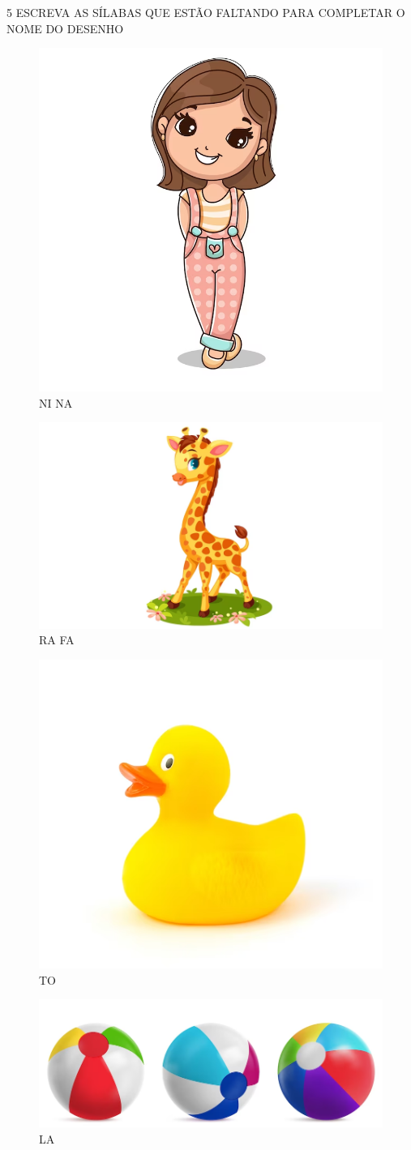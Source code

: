 \num{5} ESCREVA AS SÍLABAS QUE ESTÃO FALTANDO PARA COMPLETAR O
NOME DO
DESENHO


\begin{figure}[htpb!]
\centering
\includegraphics[width=.3\textwidth]{media/image17.png}
\caption{ NI NA}
\end{figure}

\begin{figure}[htpb!]
\centering
\includegraphics[width=.3\textwidth]{media/image18.png}
\caption{ RA FA}
\end{figure}

\begin{figure}[htpb!]
\centering
\includegraphics[width=.3\textwidth]{media/image19.png}
\caption{ TO}
\end{figure}

\begin{figure}[htpb!]
\centering
\includegraphics[width=.3\textwidth]{media/image20.png}
\caption{ LA}
\end{figure}


